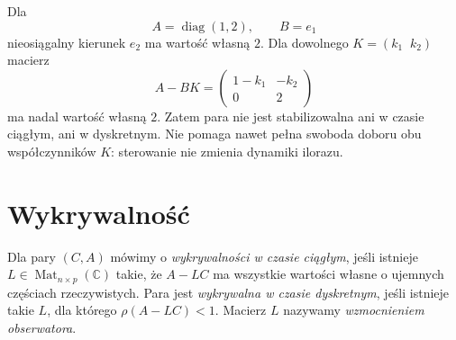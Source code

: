 \begin{przyklad}
\label{prz:lin25-not-stabilizable}
Dla
\[
 A=\operatorname{diag}(1,2),
 \qquad B=e_1
\]
nieosiągalny kierunek \(e_2\)
ma wartość własną \(2\).
Dla dowolnego
\(K=(k_1\;\;k_2)\)
macierz
\[
 A-BK=
 \begin{pmatrix}1-k_1&-k_2\\0&2\end{pmatrix}
\]
ma nadal wartość własną \(2\).
Zatem para nie jest
stabilizowalna ani w czasie
ciągłym, ani w dyskretnym.
Nie pomaga nawet pełna
swoboda doboru obu
współczynników \(K\):
sterowanie nie zmienia
dynamiki ilorazu.
\end{przyklad}

\section{Wykrywalność}
\label{sec:lin25-detectability}

\begin{definicja}[Wykrywalność]
\label{def:lin25-detectability}
Dla pary \((C,A)\)
mówimy o \emph{wykrywalności
w czasie ciągłym},
jeśli istnieje
\(L\in\operatorname{Mat}_{n\times p}(\mathbb C)\)
takie, że
\(A-LC\) ma wszystkie
wartości własne
o ujemnych częściach rzeczywistych.
Para jest \emph{wykrywalna
w czasie dyskretnym},
jeśli istnieje takie \(L\),
dla którego \(\rho(A-LC)<1\).
Macierz \(L\) nazywamy
\emph{wzmocnieniem obserwatora}.
\end{definicja}


